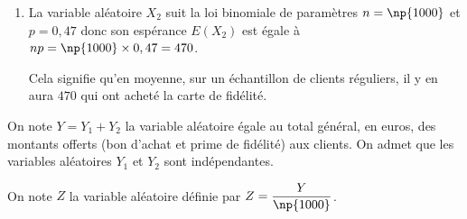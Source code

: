\medskip

\begin{enumerate}
\item %
La variable aléatoire $X_2$ suit la loi binomiale de paramètres $n=\np{1000}$ et $p=0,47$ donc son espérance $E(X_2)$ est égale à $np=\np{1000}\times 0,47=470$.

Cela signifie qu'en moyenne, sur un échantillon de  clients réguliers, il y en aura $470$ qui ont acheté la carte de fidélité.
\end{enumerate}

On note $Y = Y_1 + Y_2$ la variable aléatoire égale au total général, en euros, des montants offerts (bon d'achat et prime de fidélité) aux  clients. On admet que les variables aléatoires $Y_1$ et $Y_2$ sont indépendantes.

On note $Z$ la variable aléatoire définie par $Z = \dfrac{Y}{\np{1000}}$.

